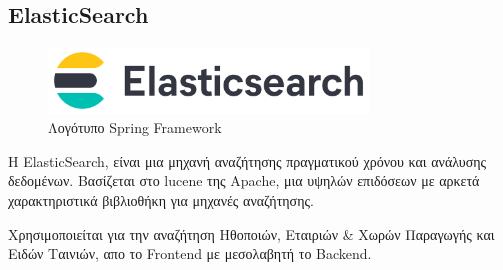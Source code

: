 \subsection{ElasticSearch}

\begin{figure}[h]
  \centering
  \includegraphics[width=85mm]{Chapters/3 - Technologies/Images/elastic-search-logo-color-horizontal.png}
  \caption{Λογότυπο Spring Framework}
  \label{fig:elasticsearch-logo}
\end{figure}
Η ElasticSearch, είναι μια μηχανή αναζήτησης πραγματικού χρόνου και ανάλυσης δεδομένων. Βασίζεται στο lucene της Apache, μια υψηλών επιδόσεων με αρκετά χαρακτηριστικά βιβλιοθήκη για μηχανές αναζήτησης. ~\citep{wiki:elastic}

Χρησιμοποιείται για την αναζήτηση Ηθοποιών, Εταιριών \& Χωρών Παραγωγής και Ειδών Ταινιών, απο το Frontend με μεσολαβητή το Backend.